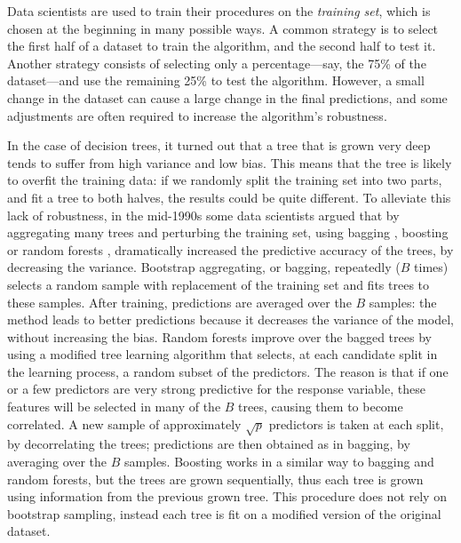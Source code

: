 \documentclass{statsoc}
\begin{document}
Data scientists are used to train their procedures on the \emph{training set}, which is chosen at the beginning in many possible ways. A common strategy is to select the first half of a 
dataset to train the algorithm, and the second half to test it. Another strategy consists of selecting only a percentage---say, the 75\% of the dataset---and use the remaining 25\% to  test the algorithm. However, a small change in the dataset can cause a large change in the final predictions, and some adjustments are often required to increase the algorithm's robustness. 

In the case of decision trees, it turned out that a tree that is grown very deep tends to suffer from high variance and low bias. This means that the tree is likely to 
overfit the training data: if we randomly split the training set into two parts, and fit a tree to both halves, the results could be quite different. To alleviate this lack of 
robustness, in the mid-1990s some data scientists argued that by aggregating many trees and perturbing the training set, using bagging \citep{breiman1996bagging}, boosting 
\citep{freund1996experiments} or random forests \citep{ho1995random}, dramatically increased the predictive accuracy of the trees, by decreasing the variance. Bootstrap 
aggregating, or bagging, repeatedly ($B$ times) selects a random sample with replacement of the training set and fits trees to these samples. After training, predictions are averaged 
over the $B$ samples: the method leads to better predictions  because it decreases the variance of the model, without increasing the bias. Random forests improve over the bagged 
trees by using a modified tree learning algorithm that selects, at each candidate split in the learning process, a random subset of the predictors. The reason is that if one or a few 
predictors are very strong predictive for the response variable, these features will be selected in many of the $B$ trees, causing them to become correlated. A new sample of 
approximately $\sqrt{p}$ predictors is taken at each split, by decorrelating the trees; predictions are then obtained as in bagging, by averaging over the $B$ samples. Boosting 
works in a similar way to bagging and random forests, but the trees are grown sequentially, thus each tree is grown using information from the previous grown tree. This procedure does 
not rely on bootstrap sampling, instead each tree is fit on a modified version of the original dataset.


\color{blue}
\end{document}
